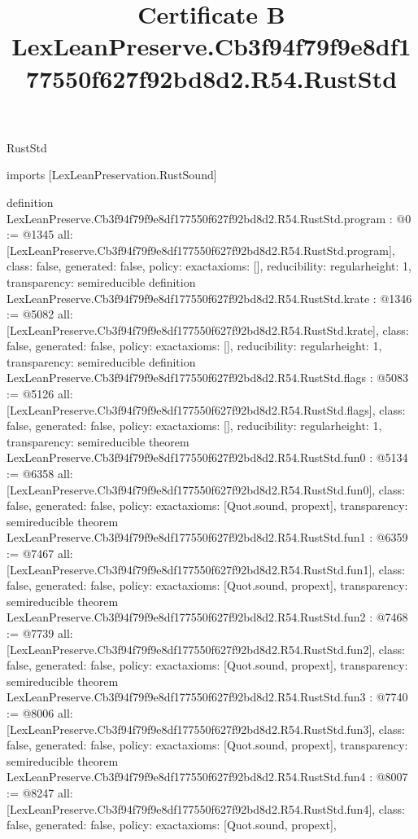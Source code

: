 \begin{lexlean}{RustStd}
\title{Certificate B LexLeanPreserve.Cb3f94f79f9e8df177550f627f92bd8d2.R54.RustStd}
\begin{coremodule}
imports [LexLeanPreservation.RustSound]

definition LexLeanPreserve.Cb3f94f79f9e8df177550f627f92bd8d2.R54.RustStd.program : @0 := @1345 {
  all: [LexLeanPreserve.Cb3f94f79f9e8df177550f627f92bd8d2.R54.RustStd.program],
  class: false,
  generated: false,
  policy: exact{axioms: []},
  reducibility: regular{height: 1},
  transparency: semireducible
}
definition LexLeanPreserve.Cb3f94f79f9e8df177550f627f92bd8d2.R54.RustStd.krate : @1346 := @5082 {
  all: [LexLeanPreserve.Cb3f94f79f9e8df177550f627f92bd8d2.R54.RustStd.krate],
  class: false,
  generated: false,
  policy: exact{axioms: []},
  reducibility: regular{height: 1},
  transparency: semireducible
}
definition LexLeanPreserve.Cb3f94f79f9e8df177550f627f92bd8d2.R54.RustStd.flags : @5083 := @5126 {
  all: [LexLeanPreserve.Cb3f94f79f9e8df177550f627f92bd8d2.R54.RustStd.flags],
  class: false,
  generated: false,
  policy: exact{axioms: []},
  reducibility: regular{height: 1},
  transparency: semireducible
}
theorem LexLeanPreserve.Cb3f94f79f9e8df177550f627f92bd8d2.R54.RustStd.fun0 : @5134 := @6358 {
  all: [LexLeanPreserve.Cb3f94f79f9e8df177550f627f92bd8d2.R54.RustStd.fun0],
  class: false,
  generated: false,
  policy: exact{axioms: [Quot.sound, propext]},
  transparency: semireducible
}
theorem LexLeanPreserve.Cb3f94f79f9e8df177550f627f92bd8d2.R54.RustStd.fun1 : @6359 := @7467 {
  all: [LexLeanPreserve.Cb3f94f79f9e8df177550f627f92bd8d2.R54.RustStd.fun1],
  class: false,
  generated: false,
  policy: exact{axioms: [Quot.sound, propext]},
  transparency: semireducible
}
theorem LexLeanPreserve.Cb3f94f79f9e8df177550f627f92bd8d2.R54.RustStd.fun2 : @7468 := @7739 {
  all: [LexLeanPreserve.Cb3f94f79f9e8df177550f627f92bd8d2.R54.RustStd.fun2],
  class: false,
  generated: false,
  policy: exact{axioms: [Quot.sound, propext]},
  transparency: semireducible
}
theorem LexLeanPreserve.Cb3f94f79f9e8df177550f627f92bd8d2.R54.RustStd.fun3 : @7740 := @8006 {
  all: [LexLeanPreserve.Cb3f94f79f9e8df177550f627f92bd8d2.R54.RustStd.fun3],
  class: false,
  generated: false,
  policy: exact{axioms: [Quot.sound, propext]},
  transparency: semireducible
}
theorem LexLeanPreserve.Cb3f94f79f9e8df177550f627f92bd8d2.R54.RustStd.fun4 : @8007 := @8247 {
  all: [LexLeanPreserve.Cb3f94f79f9e8df177550f627f92bd8d2.R54.RustStd.fun4],
  class: false,
  generated: false,
  policy: exact{axioms: [Quot.sound, propext]},
}
\end{coremodule}
\end{lexlean}
